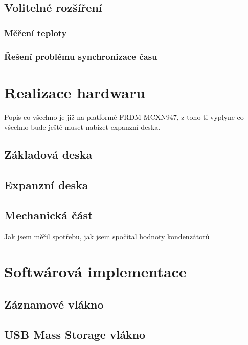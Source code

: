 
\section{Volitelné rozšíření}
\subsection{Měření teploty}


\subsection{Řešení problému synchronizace času}


\chapter{Realizace hardwaru}
Popis co všechno je již na platformě FRDM MCXN947, z toho ti vyplyne co všechno bude ještě muset nabízet expanzní deska.
\section{Základová deska}
\section{Expanzní deska}

\section{Mechanická část}
Jak jsem měřil spotřebu, jak jsem spočítal hodnoty kondenzátorů

\chapter{Softwárová implementace}

\section{Záznamové vlákno}

\section{USB Mass Storage vlákno}


